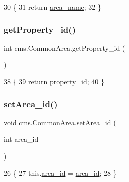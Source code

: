 \begin{DoxyCode}
30                                  \{
31         \textcolor{keywordflow}{return} \mbox{\hyperlink{classcms_1_1_common_area_a5f5060702efd265baeb61a83a9135088}{area\_name}};
32     \}
\end{DoxyCode}
\mbox{\label{classcms_1_1_common_area_a09cd28c7fc06cde4a06193cf00f8ac92}} 
\subsubsection{\texorpdfstring{get\+Property\+\_\+id()}{getProperty\_id()}}
{\footnotesize\ttfamily int cms.\+Common\+Area.\+get\+Property\+\_\+id (\begin{DoxyParamCaption}{ }\end{DoxyParamCaption})\hspace{0.3cm}{\ttfamily [inline]}}


\begin{DoxyCode}
38                                 \{
39         \textcolor{keywordflow}{return} \mbox{\hyperlink{classcms_1_1_common_area_ad40e54e3b27cd75b9010bb8bc3d3acca}{property\_id}};
40     \}
\end{DoxyCode}
\mbox{\label{classcms_1_1_common_area_a638300af7cbf39637ec8eb4003948759}} 
\subsubsection{\texorpdfstring{set\+Area\+\_\+id()}{setArea\_id()}}
{\footnotesize\ttfamily void cms.\+Common\+Area.\+set\+Area\+\_\+id (\begin{DoxyParamCaption}\item[{int}]{area\+\_\+id }\end{DoxyParamCaption})\hspace{0.3cm}{\ttfamily [inline]}}


\begin{DoxyCode}
26                                         \{
27         this.\mbox{\hyperlink{classcms_1_1_common_area_a60b2c63a3a45ca2ac12dc5aa6cd9c8c6}{area\_id}} = \mbox{\hyperlink{classcms_1_1_common_area_a60b2c63a3a45ca2ac12dc5aa6cd9c8c6}{area\_id}};
28     \}
\end{DoxyCode}
\mbox{\label{classcms_1_1_common_area_aa3c6ef585e3fb3721312e2e22edcd9d7}} 
